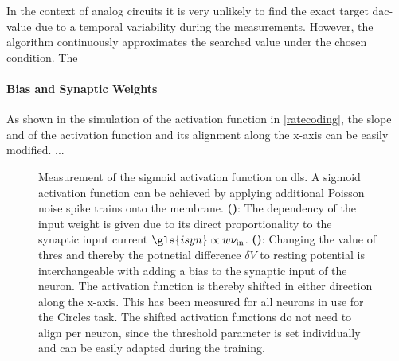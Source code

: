 In the context of analog circuits it is very unlikely to find the exact target \gls{dac}-value due to a temporal variability during the measurements. However, the algorithm continuously approximates the searched value under the chosen condition. The 


\paragraph{Bias and Synaptic Weights} As shown in the simulation of the activation function in \cref{ratecoding}, the slope and of the activation function and its alignment along the x-axis can be easily modified. ...

\begin{figure}
	\begin{subfigure}[c]{0.5\textwidth}
		\centering
		\caption{}
		
		\label{dlsactivationfunctionweight}
	\end{subfigure}	
	\begin{subfigure}[c]{0.5\textwidth}
		\centering
		\caption{}
		
		\label{dlsactivationfunctionbias}
	\end{subfigure}
	\caption[Measurement of the sigmoid activation function on \gls{dls}]{Measurement of the sigmoid activation function on \gls{dls}. A sigmoid activation function can be achieved by applying additional Poisson noise spike trains onto the membrane. \textbf{()}: The dependency of the input weight is given due to its direct proportionality to the synaptic input current $\gls{isyn} \propto w \nu_\text{in}$. \textbf{()}: Changing the value of \gls{thres} and thereby the potnetial difference $\delta V$ to resting potential is interchangeable with adding a bias to the synaptic input of the neuron. The activation function is thereby shifted in either direction along the x-axis. This has been measured for all neurons in use for the Circles task. The shifted activation functions do not need to align per neuron, since the threshold parameter is set individually and can be easily adapted during the training.}
\end{figure}
%
%		

